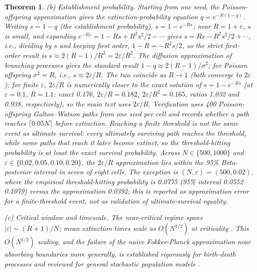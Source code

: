 \documentclass[review]{elsarticle}
\theoremstyle{plain}
\newtheorem{theorem}{Theorem}
\theoremstyle{definition}
\begin{document}
\begin{theorem}
(b) Establishment probability. Starting from one seed, the Poisson-offspring approximation gives the extinction-probability equation $q = e^{-R(1-q)}$. Writing $s = 1 - q$ (the establishment probability), $s = 1 - e^{-Rs}$; near $R = 1+\varepsilon$, $s$ is small, and expanding $e^{-Rs} = 1 - Rs + R^2s^2/2 - \cdots$ gives $s = Rs - R^2s^2/2 + \cdots$, i.e., dividing by $s$ and keeping first order, $1 - R = -R^2s/2$, so the strict first-order result is $s \approx 2(R-1)/R^2 = 2\varepsilon/R^2$. The diffusion approximation of branching processes gives the standard result $1 - q \approx 2(R-1)/\sigma^2$; for Poisson offspring $\sigma^2 = R$, i.e., $s \approx 2\varepsilon/R$. The two coincide as $R \to 1$ (both converge to $2\varepsilon$); for finite $\varepsilon$, $2\varepsilon/R$ is numerically closer to the exact solution of $s = 1 - e^{-Rs}$ (at $\varepsilon = 0.1$, $R = 1.1$: exact 0.176, $2\varepsilon/R = 0.182$, $2\varepsilon/R^2 = 0.165$, ratios 1.032 and 0.938, respectively), so the main text uses $2\varepsilon/R$. Verification uses 400 Poisson-offspring Galton--Watson paths from one seed per cell and records whether a path reaches $\lceil0.05N\rceil$ before extinction. Reaching a finite threshold is not the same event as ultimate survival: every ultimately surviving path reaches the threshold, while some paths that reach it later become extinct, so the threshold-hitting probability is at least the exact survival probability. Across $N\in\{500,1000\}$ and $\varepsilon\in\{0.02,0.05,0.10,0.20\}$, the $2\varepsilon/R$ approximation lies within the 95\% Beta-posterior interval in seven of eight cells. The exception is $(N,\varepsilon)=(500,0.02)$, where the empirical threshold-hitting probability is 0.0775 (95\% interval 0.0552--0.1079) versus the approximation 0.0392; this is reported as approximation error for a finite-threshold event, not as validation of ultimate-survival equality.

(c) Critical window and timescale. The near-critical regime spans $|\varepsilon| \sim (R+1)/N$; mean extinction times scale as $O(N^{1/2})$ at criticality \citep{doering2005extinction, nassel2001extinction, kessler2007extinction, assaf2017extinction}. This $O(N^{1/2})$ scaling, and the failure of the naive Fokker-Planck approximation near absorbing boundaries more generally, is established rigorously for birth-death processes \citep{doering2005extinction} and reviewed for general stochastic population models \citep{ovaskainen2010stochastic}.
\end{theorem}
\end{document}
